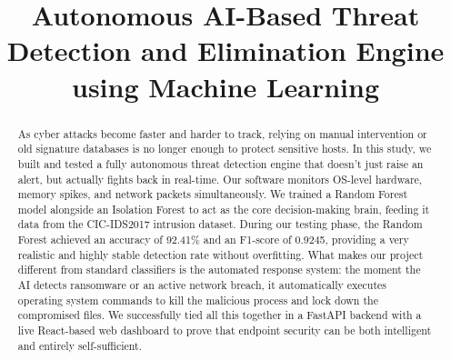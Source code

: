 \documentclass[conference]{IEEEtran}
\begin{document}
\title{Autonomous AI-Based Threat Detection and Elimination Engine using Machine Learning}

\author{
\and
{}
\and
{}
\and
{}
\and
{}
}

\maketitle

\begin{abstract}
As cyber attacks become faster and harder to track, relying on manual intervention or old signature databases is no longer enough to protect sensitive hosts. In this study, we built and tested a fully autonomous threat detection engine that doesn't just raise an alert, but actually fights back in real-time. Our software monitors OS-level hardware, memory spikes, and network packets simultaneously. We trained a Random Forest model alongside an Isolation Forest to act as the core decision-making brain, feeding it data from the CIC-IDS2017 intrusion dataset. During our testing phase, the Random Forest achieved an accuracy of 92.41\% and an F1-score of 0.9245, providing a very realistic and highly stable detection rate without overfitting. What makes our project different from standard classifiers is the automated response system: the moment the AI detects ransomware or an active network breach, it automatically executes operating system commands to kill the malicious process and lock down the compromised files. We successfully tied all this together in a FastAPI backend with a live React-based web dashboard to prove that endpoint security can be both intelligent and entirely self-sufficient.
\end{abstract}
\end{document}
